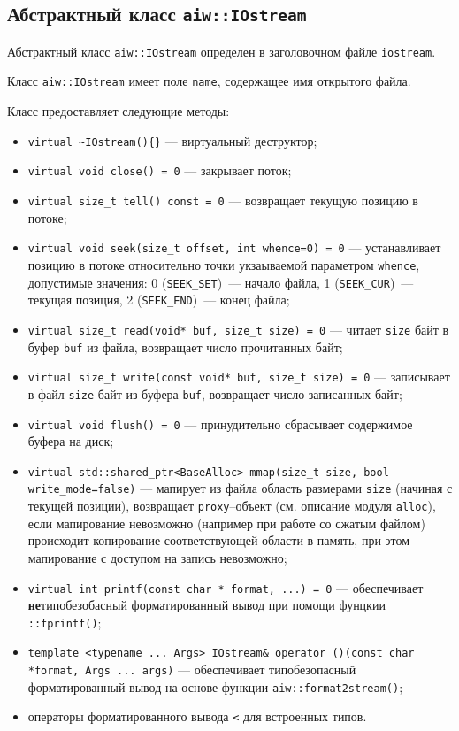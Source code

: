 \subsection{Абстрактный класс {\tt aiw::IOstream}}
Абстрактный класс \verb'aiw::IOstream' определен в заголовочном файле \verb'iostream'.

Класс \verb'aiw::IOstream' имеет поле \verb'name', содержащее имя открытого файла.

Класс предоставляет следующие методы:
\begin{itemize}
\item \verb'virtual ~IOstream(){}' --- виртуальный деструктор;
\item \verb'virtual void close() = 0' --- закрывает поток;
\item \verb'virtual size_t tell() const = 0' --- возвращает текущую позицию в потоке;
\item \verb'virtual void seek(size_t offset, int whence=0) = 0' --- устанавливает позицию в потоке относительно
  точки укзаываемой параметром \verb'whence', допустимые значения: 0 (\verb'SEEK_SET')~--- начало файла,
  1 (\verb'SEEK_CUR')~--- текущая позиция, 2 (\verb'SEEK_END')~--- конец файла;
\item \verb'virtual size_t read(void* buf, size_t size) = 0' --- читает \verb'size' байт в буфер \verb'buf' из файла,
  возвращает число прочитанных байт;
\item \verb'virtual size_t write(const void* buf, size_t size) = 0' --- записывает в файл \verb'size' байт из буфера \verb'buf',
  возвращает число записанных байт;
\item \verb'virtual void flush() = 0' --- принудительно сбрасывает содержимое буфера на диск;
\item \verb'virtual std::shared_ptr<BaseAlloc> mmap(size_t size, bool write_mode=false)' --- мапирует из файла область
  размерами \verb'size' (начиная с текущей позиции), возвращает \verb'proxy'--объект (см. описание модуля \verb'alloc'),
  если мапирование невозможно (например при работе со сжатым файлом) происходит копирование
  соответствующей области в память, при этом мапирование с доступом на запись невозможно;
\item \verb'virtual int printf(const char * format, ...) = 0' --- обеспечивает
  {\bf не}типобезобасный форматированный вывод при помощи фунцкии \verb'::fprintf()';
\item \verb'template <typename ... Args> IOstream& operator ()(const char *format, Args ... args)' --- обеспечивает
  типобезопасный форматированный вывод на основе функции  \verb'aiw::format2stream()';
\item операторы форматированного вывода \verb'<' для встроенных типов.
\end{itemize}


